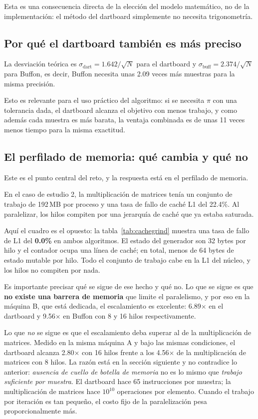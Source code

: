 Esta es una consecuencia directa de la elección del modelo matemático, no de la implementación: el método del dartboard simplemente no necesita trigonometría.

\subsection{Por qué el dartboard también es más preciso}

La desviación teórica es $\sigma_{\text{dart}} = 1.642/\sqrt{N}$ para el dartboard y $\sigma_{\text{buff}} = 2.374/\sqrt{N}$ para Buffon, es decir, Buffon necesita unas 2.09 veces más muestras para la misma precisión.

Esto es relevante para el uso práctico del algoritmo: si se necesita $\pi$ con una tolerancia dada, el dartboard alcanza el objetivo con menos trabajo, y como además cada muestra es más barata, la ventaja combinada es de unas 11 veces menos tiempo para la misma exactitud.

\subsection{El perfilado de memoria: qué cambia y qué no}

Este es el punto central del reto, y la respuesta está en el perfilado de memoria.

En el caso de estudio 2, la multiplicación de matrices tenía un conjunto de trabajo de 192\,MB por proceso y una tasa de fallo de caché L1 del 22.4\%. Al paralelizar, los hilos compiten por una jerarquía de caché que ya estaba saturada.

Aquí el cuadro es el opuesto: la tabla~\ref{tab:cachegrind} muestra una tasa de fallo de L1 del \textbf{0.0\%} en ambos algoritmos. El estado del generador son 32 bytes por hilo y el contador ocupa una línea de caché; en total, menos de 64 bytes de estado mutable por hilo. Todo el conjunto de trabajo cabe en la L1 del núcleo, y los hilos no compiten por nada.

Es importante precisar qué se sigue de ese hecho y qué no. Lo que se sigue es que \textbf{no existe una barrera de memoria} que limite el paralelismo, y por eso en la máquina B, que está dedicada, el escalamiento es excelente: 6.89$\times$ en el dartboard y 9.56$\times$ en Buffon con 8 y 16 hilos respectivamente.

Lo que \emph{no} se sigue es que el escalamiento deba superar al de la multiplicación de matrices. Medido en la misma máquina A y bajo las mismas condiciones, el dartboard alcanza 2.80$\times$ con 16 hilos frente a los 4.56$\times$ de la multiplicación de matrices con 8 hilos. La razón está en la sección siguiente y no contradice lo anterior: \emph{ausencia de cuello de botella de memoria} no es lo mismo que \emph{trabajo suficiente por muestra}. El dartboard hace 65 instrucciones por muestra; la multiplicación de matrices hace $10^{10}$ operaciones por elemento. Cuando el trabajo por iteración es tan pequeño, el costo fijo de la paralelización pesa proporcionalmente más.

